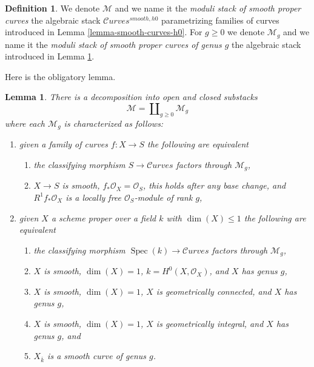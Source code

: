 \documentclass{stacks-project}
\newenvironment{reference}{\comment}{\endcomment}
\theoremstyle{plain}
\newtheorem{lemma}[subsection]{Lemma}
\theoremstyle{definition}
\newtheorem{definition}[subsection]{Definition}
\theoremstyle{remark}
\numberwithin{equation}{subsection}
\def\Spec{\mathop{\mathrm{Spec}}}
\def\Curvesstack{\mathcal{C}\!\mathit{urves}}
\begin{document}
\begin{definition}
\label{definition-deligne-mumford-smooth}
\begin{reference}
\cite{DM}
\end{reference}
We denote $\mathcal{M}$ and we name it the
{\it moduli stack of smooth proper curves}
the algebraic stack
$\Curvesstack^{smooth, h0}$ parametrizing families of curves
introduced in Lemma \ref{lemma-smooth-curves-h0}.
For $g \geq 0$ we denote $\mathcal{M}_g$ and we name it the
{\it moduli stack of smooth proper curves of genus $g$}
the algebraic stack introduced in
Lemma \ref{lemma-smooth-one-piece-per-genus}.
\end{definition}

\noindent
Here is the obligatory lemma.

\begin{lemma}
\label{lemma-smooth-one-piece-per-genus}
There is a decomposition into open and closed substacks
$$
\mathcal{M} = \coprod\nolimits_{g \geq 0} \mathcal{M}_g
$$
where each $\mathcal{M}_g$ is characterized as follows:
\begin{enumerate}
\item given a family of curves $f : X \to S$ the following are equivalent
\begin{enumerate}
\item the classifying morphism $S \to \Curvesstack$ factors
through $\mathcal{M}_g$,
\item $X \to S$ is smooth, $f_*\mathcal{O}_X = \mathcal{O}_S$,
this holds after any base change, and $R^1f_*\mathcal{O}_X$
is a locally free $\mathcal{O}_S$-module of rank $g$,
\end{enumerate}
\item given $X$ a scheme proper over a field $k$ with
$\dim(X) \leq 1$ the following are equivalent
\begin{enumerate}
\item the classifying morphism $\Spec(k) \to \Curvesstack$
factors through $\mathcal{M}_g$,
\item $X$ is smooth, $\dim(X) = 1$, $k = H^0(X, \mathcal{O}_X)$,
and $X$ has genus $g$,
\item $X$ is smooth, $\dim(X) = 1$, $X$ is geometrically connected, and
$X$ has genus $g$,
\item $X$ is smooth, $\dim(X) = 1$, $X$ is geometrically integral, and
$X$ has genus $g$, and
\item $X_{\overline{k}}$ is a smooth curve of genus $g$.
\end{enumerate}
\end{enumerate}
\end{lemma}
\end{document}

